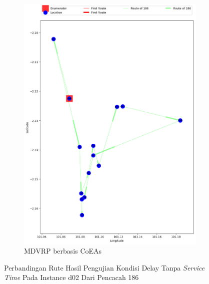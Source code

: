 \begin{figure}[H]
	\centering
	\begin{subfigure}[t]{\textwidth}
		\centering
		\includegraphics[width=\textwidth]{Resources/Images/delayed_2/real_m15_n100_delayed_2_186_coes}
		\caption{MDVRP berbasis CoEAs}
		\label{fig:real_m15_n100_delayed_2_186_coes}
	\end{subfigure}
	\caption{Perbandingan Rute Hasil Pengujian Kondisi Delay Tanpa \textit{Service Time} Pada Instance d02 Dari Pencacah 186}
	\label{fig:real_m15_n100_delayed_2_186}
\end{figure}


